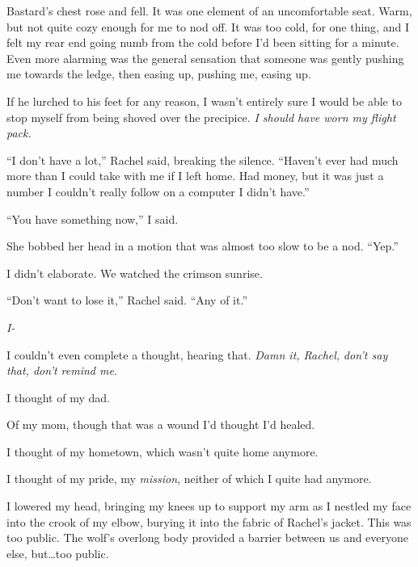 Bastard's chest rose and fell.  It was one element of an uncomfortable seat.  Warm, but not quite cozy enough for me to nod off.  It was too cold, for one thing, and I felt my rear end going numb from the cold before I'd been sitting for a minute.  Even more alarming was the general sensation that someone was gently pushing me towards the ledge, then easing up, pushing me, easing up.



If he lurched to his feet for any reason, I wasn't entirely sure I would be able to stop myself from being shoved over the precipice.  \emph{I should have worn my flight pack.}



``I don't have a lot,'' Rachel said, breaking the silence.  ``Haven't ever had much more than I could take with me if I left home.  Had money, but it was just a number I couldn't really follow on a computer I didn't have.''



``You have something now,'' I said.



She bobbed her head in a motion that was almost too slow to be a nod.  ``Yep.''



I didn't elaborate.  We watched the crimson sunrise.



``Don't want to lose it,'' Rachel said.  ``Any of it.''



\emph{I-}



I couldn't even complete a thought, hearing that.  \emph{Damn it, Rachel, }\emph{don't say that, don't remind me}.



I thought of my dad.



Of my mom, though that was a wound I'd thought I'd healed.



I thought of my hometown, which wasn't quite home anymore.



I thought of my pride, my \emph{mission}, neither of which I quite had anymore.



I lowered my head, bringing my knees up to support my arm as I nestled my face into the crook of my elbow, burying it into the fabric of Rachel's jacket.  This was too public.  The wolf's overlong body provided a barrier between us and everyone else, but\ldots too public.



